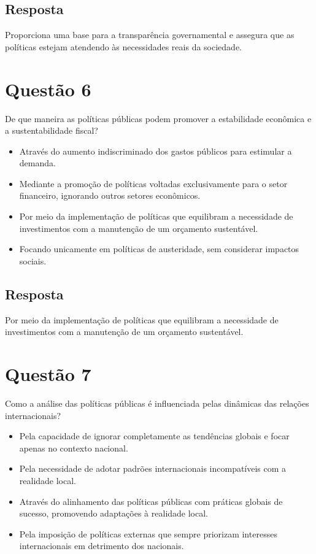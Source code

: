 \documentclass[
   article,       
   12pt,          
   oneside,       
   a4paper,       
   english,       
   brazil,        
   sumario=tradicional
   ]{abntex2}
\begin{document}
\subsection{Resposta}
Proporciona uma base para a transparência governamental e assegura que as políticas estejam atendendo às necessidades reais da sociedade.

\section{Questão 6}
De que maneira as políticas públicas podem promover a estabilidade econômica e a sustentabilidade fiscal?

\begin{itemize}
  \item Através do aumento indiscriminado dos gastos públicos para estimular a demanda.
  \item Mediante a promoção de políticas voltadas exclusivamente para o setor financeiro, ignorando outros setores econômicos.
  \item Por meio da implementação de políticas que equilibram a necessidade de investimentos com a manutenção de um orçamento sustentável.
  \item Focando unicamente em políticas de austeridade, sem considerar impactos sociais.
\end{itemize}

\subsection{Resposta}
Por meio da implementação de políticas que equilibram a necessidade de investimentos com a manutenção de um orçamento sustentável.

\section{Questão 7}
Como a análise das políticas públicas é influenciada pelas dinâmicas das relações internacionais?

\begin{itemize}
  \item Pela capacidade de ignorar completamente as tendências globais e focar apenas no contexto nacional.
  \item Pela necessidade de adotar padrões internacionais incompatíveis com a realidade local.
  \item Através do alinhamento das políticas públicas com práticas globais de sucesso, promovendo adaptações à realidade local.
  \item Pela imposição de políticas externas que sempre priorizam interesses internacionais em detrimento dos nacionais.
\end{itemize}
\end{document}
